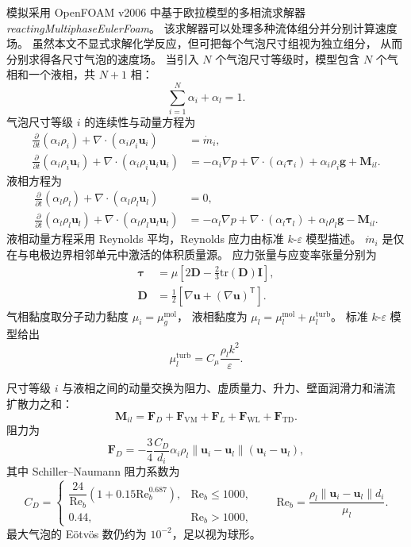 \documentclass[UTF8,zihao=-4,fontset=fandol]{ctexart}
\newcommand{\vect}[1]{\bm{#1}}
\begin{document}
模拟采用 OpenFOAM v2006 中基于欧拉模型的多相流求解器
\emph{reactingMultiphaseEulerFoam}。
该求解器可以处理多种流体组分并分别计算速度场。
虽然本文不显式求解化学反应，但可把每个气泡尺寸组视为独立组分，
从而分别求得各尺寸气泡的速度场。
当引入 \(N\) 个气泡尺寸等级时，模型包含 \(N\) 个气相和一个液相，共 \(N+1\) 相：
\begin{equation}
\sum_{i=1}^{N}\alpha_i+\alpha_l=1. \tag{1}
\end{equation}
气泡尺寸等级 \(i\) 的连续性与动量方程为
\begin{align}
\frac{\partial}{\partial t}(\alpha_i\rho_i)+
\nabla\cdot(\alpha_i\rho_i\vect u_i)&=\dot m_i, \tag{2}\\
\frac{\partial}{\partial t}(\alpha_i\rho_i\vect u_i)+
\nabla\cdot(\alpha_i\rho_i\vect u_i\vect u_i)
&=-\alpha_i\nabla p+\nabla\cdot(\alpha_i\vect\tau_i)
+\alpha_i\rho_i\vect g+\vect M_{il}. \tag{3}
\end{align}
液相方程为
\begin{align}
\frac{\partial}{\partial t}(\alpha_l\rho_l)+
\nabla\cdot(\alpha_l\rho_l\vect u_l)&=0, \tag{4}\\
\frac{\partial}{\partial t}(\alpha_l\rho_l\vect u_l)+
\nabla\cdot(\alpha_l\rho_l\vect u_l\vect u_l)
&=-\alpha_l\nabla p+\nabla\cdot(\alpha_l\vect\tau_l)
+\alpha_l\rho_l\vect g-\vect M_{il}. \tag{5}
\end{align}
液相动量方程采用 Reynolds 平均，Reynolds 应力由标准 \(k\)-\(\varepsilon\) 模型描述。
\(\dot m_i\) 是仅在与电极边界相邻单元中激活的体积质量源。
应力张量与应变率张量分别为
\begin{align}
\vect\tau&=\mu\left[2\vect D-\frac{2}{3}\mathrm{tr}(\vect D)\vect I\right], \tag{6}\\
\vect D&=\frac12\left[\nabla\vect u+(\nabla\vect u)^\mathsf T\right]. \tag{7}
\end{align}
气相黏度取分子动力黏度 \(\mu_i=\mu_g^{\mathrm{mol}}\)，
液相黏度为 \(\mu_l=\mu_l^{\mathrm{mol}}+\mu_l^{\mathrm{turb}}\)。
标准 \(k\)-\(\varepsilon\) 模型给出
\begin{equation}
\mu_l^{\mathrm{turb}}=C_\mu\frac{\rho_lk^2}{\varepsilon}. \tag{8}
\end{equation}

尺寸等级 \(i\) 与液相之间的动量交换为阻力、虚质量力、升力、壁面润滑力和湍流扩散力之和：
\begin{equation}
\vect M_{il}=\vect F_D+\vect F_{\mathrm{VM}}+\vect F_L+\vect F_{\mathrm{WL}}+\vect F_{\mathrm{TD}}. \tag{9}
\end{equation}
阻力为
\begin{equation}
\vect F_D=-\frac34\frac{C_D}{d_i}\alpha_i\rho_l
\lVert\vect u_i-\vect u_l\rVert(\vect u_i-\vect u_l), \tag{10}
\end{equation}
其中 Schiller--Naumann 阻力系数为
\begin{equation}
C_D=
\begin{cases}
\dfrac{24}{\mathrm{Re}_b}\left(1+0.15\mathrm{Re}_b^{0.687}\right),&
\mathrm{Re}_b\le1000,\\
0.44,&\mathrm{Re}_b>1000,
\end{cases}\qquad
\mathrm{Re}_b=\frac{\rho_l\lVert\vect u_i-\vect u_l\rVert d_i}{\mu_l}. \tag{11}
\end{equation}
最大气泡的 Eötvös 数仍约为 \(10^{-2}\)，足以视为球形。
\end{document}
